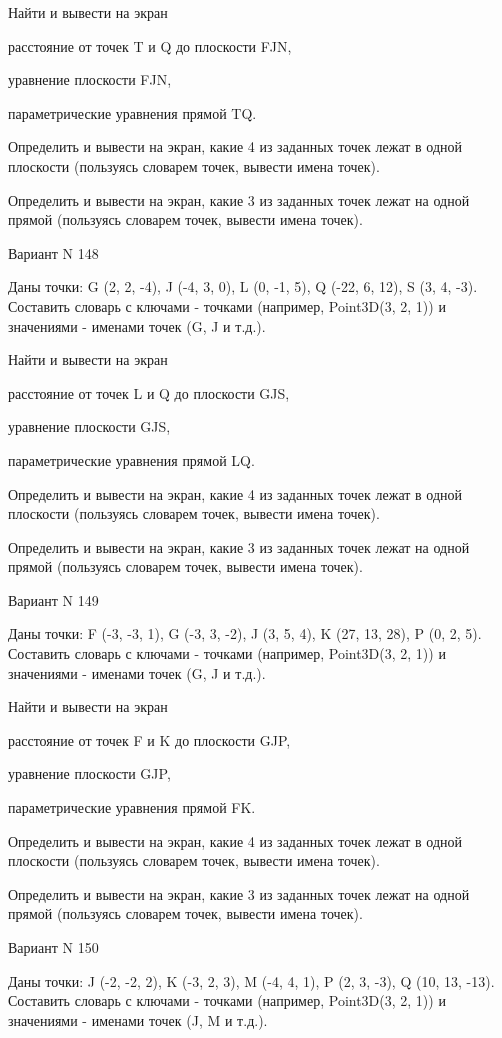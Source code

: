 \documentclass[11pt]{report}
\begin{document}
Найти и вывести на экран


расстояние от точек T и Q до плоскости FJN,


уравнение плоскости FJN,


параметрические уравнения прямой TQ.


Определить и вывести на экран, какие 4 из заданных точек лежат в одной плоскости (пользуясь словарем точек, вывести имена точек).


Определить и вывести на экран, какие 3 из заданных точек лежат на одной прямой (пользуясь словарем точек, вывести имена точек).

\newpage
Вариант N 148

Даны точки: G (2, 2, -4), J (-4, 3, 0), L (0, -1, 5), Q (-22, 6, 12), S (3, 4, -3).
Составить словарь с ключами - точками (например, Point3D(3, 2, 1)) и значениями - именами точек (G, J и т.д.).


Найти и вывести на экран


расстояние от точек L и Q до плоскости GJS,


уравнение плоскости GJS,


параметрические уравнения прямой LQ.


Определить и вывести на экран, какие 4 из заданных точек лежат в одной плоскости (пользуясь словарем точек, вывести имена точек).


Определить и вывести на экран, какие 3 из заданных точек лежат на одной прямой (пользуясь словарем точек, вывести имена точек).

\newpage
Вариант N 149

Даны точки: F (-3, -3, 1), G (-3, 3, -2), J (3, 5, 4), K (27, 13, 28), P (0, 2, 5).
Составить словарь с ключами - точками (например, Point3D(3, 2, 1)) и значениями - именами точек (G, J и т.д.).


Найти и вывести на экран


расстояние от точек F и K до плоскости GJP,


уравнение плоскости GJP,


параметрические уравнения прямой FK.


Определить и вывести на экран, какие 4 из заданных точек лежат в одной плоскости (пользуясь словарем точек, вывести имена точек).


Определить и вывести на экран, какие 3 из заданных точек лежат на одной прямой (пользуясь словарем точек, вывести имена точек).

\newpage
Вариант N 150

Даны точки: J (-2, -2, 2), K (-3, 2, 3), M (-4, 4, 1), P (2, 3, -3), Q (10, 13, -13).
Составить словарь с ключами - точками (например, Point3D(3, 2, 1)) и значениями - именами точек (J, M и т.д.).
\end{document}
